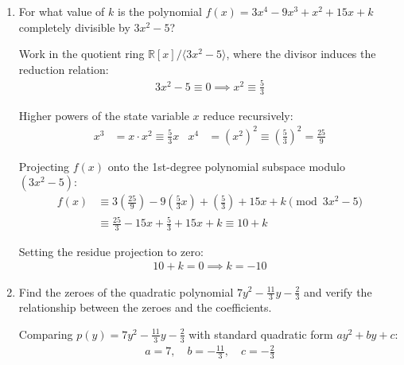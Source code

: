 \begin{enumerate}[label=\thesubsection.\arabic*, ref=\thesubsection.\theenumi]
	\begin{align*}
		\sum f_i x_i &= 14(32.5) + 16(37.5) + 28(42.5) + 23(47.5) + 18(52.5) + 8(57.5) + 3(62.5) \\
		&= 455 + 600 + 1190 + 1092.5 + 945 + 460 + 187.5 = 4930
	\end{align*}
	
	\begin{align*}
		\bar{x} &= \frac{\sum f_i x_i}{\sum f_i} = \frac{4930}{110} = \frac{493}{11} \approx 44.82
	\end{align*}
	

	\item For what value of $k$ is the polynomial $f(x)=3x^4-9x^3+x^2+15x+k$ completely divisible by $3x^2-5$?
	
	\solution
	Work in the quotient ring $\mathbb{R}[x] / \langle 3x^2 - 5 \rangle$, where the divisor induces the reduction relation:
	\begin{align*}
		3x^2 - 5 \equiv 0 \implies x^2 \equiv \frac{5}{3}
	\end{align*}
	
	Higher powers of the state variable $x$ reduce recursively:
	\begin{align*}
		x^3 &= x \cdot x^2 \equiv \frac{5}{3}x & x^4 &= (x^2)^2 \equiv \left(\frac{5}{3}\right)^2 = \frac{25}{9}
	\end{align*}
	
	Projecting $f(x)$ onto the 1st-degree polynomial subspace modulo $(3x^2 - 5)$:
	\begin{align*}
		f(x) &\equiv 3\left(\frac{25}{9}\right) - 9\left(\frac{5}{3}x\right) + \left(\frac{5}{3}\right) + 15x + k \pmod{3x^2 - 5} \\
		&\equiv \frac{25}{3} - 15x + \frac{5}{3} + 15x + k \equiv 10 + k
	\end{align*}
	
	Setting the residue projection to zero:
	\begin{align*}
		10 + k = 0 \implies k = -10
	\end{align*}
	
	
	\item Find the zeroes of the quadratic polynomial $7y^2-\frac{11}{3}y-\frac{2}{3}$ and verify the relationship between the zeroes and the coefficients.
	
	\solution
	Comparing $p(y) = 7y^2 - \frac{11}{3}y - \frac{2}{3}$ with standard quadratic form $a y^2 + b y + c$:
	\begin{align*}
		a = 7, \quad b = -\frac{11}{3}, \quad c = -\frac{2}{3}
	\end{align*}
	

\end{enumerate}
